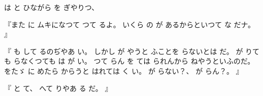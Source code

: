 
は
と
ひながら
を
ぎやりつ、

『また
に
ムキになつて
つて%
るよ。
%
いくら
の
が
あるからといつて
な
だナ。
』

『
も
して
るのぢやあ
い。
%
しかし
が
やうと
ふことを
らないとは
だ。
%
が
りても
らなくつても
は
が
い。
%
つて
らん
を
ては
られんから
ねやうといふのだ。
%
をたゞ
に
めたら
からうと
はれては
く
い。
%
が
らない？、
%
が
らん？。
』

『
と
て、
%
へて
りやあ
る
だ。
』


